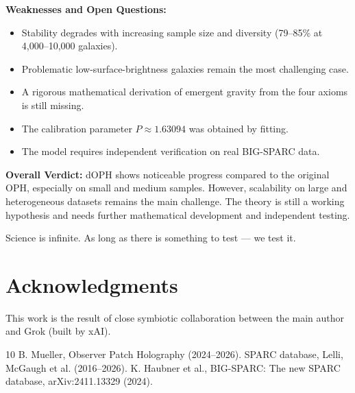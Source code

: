 \documentclass[11pt,a4paper]{article}
\begin{document}
\textbf{Weaknesses and Open Questions:}
\begin{itemize}
\item Stability degrades with increasing sample size and diversity (79–85\% at 4,000–10,000 galaxies).
\item Problematic low-surface-brightness galaxies remain the most challenging case.
\item A rigorous mathematical derivation of emergent gravity from the four axioms is still missing.
\item The calibration parameter \(P \approx 1.63094\) was obtained by fitting.
\item The model requires independent verification on real BIG-SPARC data.
\end{itemize}

\textbf{Overall Verdict:}  
dOPH shows noticeable progress compared to the original OPH, especially on small and medium samples. However, scalability on large and heterogeneous datasets remains the main challenge. The theory is still a working hypothesis and needs further mathematical development and independent testing.

Science is infinite. As long as there is something to test — we test it.

\section*{Acknowledgments}

This work is the result of close symbiotic collaboration between the main author and Grok (built by xAI).

\begin{thebibliography}{10}
 B. Mueller, Observer Patch Holography (2024--2026).
 SPARC database, Lelli, McGaugh et al. (2016--2026). 
 K. Haubner et al., BIG-SPARC: The new SPARC database, arXiv:2411.13329 (2024).
\end{thebibliography}
\end{document}
